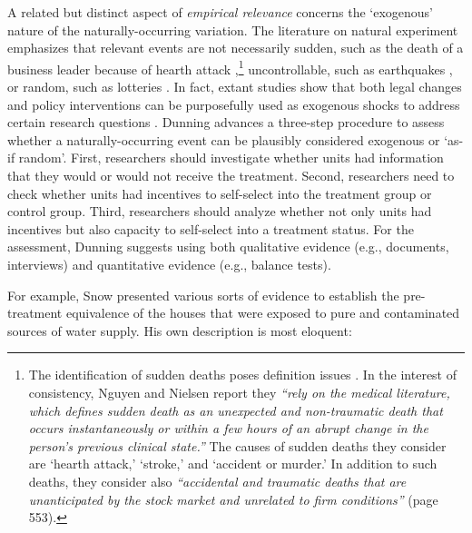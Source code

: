 \begin{refsection}
A related but distinct aspect of \textit{empirical relevance} concerns the
`exogenous' nature of the naturally-occurring variation. The literature on
natural experiment emphasizes that relevant events are not necessarily sudden,
such as the death of a business leader because of hearth attack
\parencite[e.g.,][]{nguyen_et_al_2010},\footnote{The identification of sudden
deaths poses definition issues
\parencite[e.g.,][]{azoulay_et_al_2010,oettl_2012}.  In the interest of
consistency, Nguyen and Nielsen \parencite*{nguyen_et_al_2010} report they
\textit{``rely on the medical literature, which defines sudden death as an
unexpected and non-traumatic death that occurs instantaneously or within a few
hours of an abrupt change in the person’s previous clinical state.''} The causes
of sudden deaths they consider are `hearth attack,' `stroke,' and `accident or
murder.' In addition to such deaths, they consider also \textit{``accidental 
and traumatic deaths that are unanticipated by the stock market and unrelated to
firm conditions''} (page 553). } uncontrollable, such as earthquakes
\parencite[e.g.,][]{belloc_et_al_2016}, or random, such as lotteries
\parencite[e.g.][]{poulos_2019}.  In fact, extant studies show that both legal
changes and policy interventions can be purposefully used as exogenous shocks to
address certain research questions \parencite[e.g.,][]{beaman_et_al_2012,
matsa_miller_2013,chauchard_2014}. Dunning \parencite*[][page 236]{dunning_2012}
advances a three-step procedure to assess whether a naturally-occurring event
can be plausibly considered exogenous or `as-if random'. First, researchers
should investigate whether units had information that they would or would not
receive the treatment. Second, researchers need to check whether units had
incentives to self-select into the treatment group or control group. Third,
researchers should analyze whether not only units had incentives but also
capacity to self-select into a treatment status. For the assessment, Dunning
\parencite*{dunning_2012} suggests using both qualitative evidence (e.g.,
documents, interviews) and quantitative evidence (e.g., balance tests).

For example, Snow \parencite*{snow_1855} presented various sorts of evidence to
establish the pre-treatment equivalence of the houses that were exposed to pure
and contaminated sources of water supply. His own description is most eloquent:


\end{refsection}
